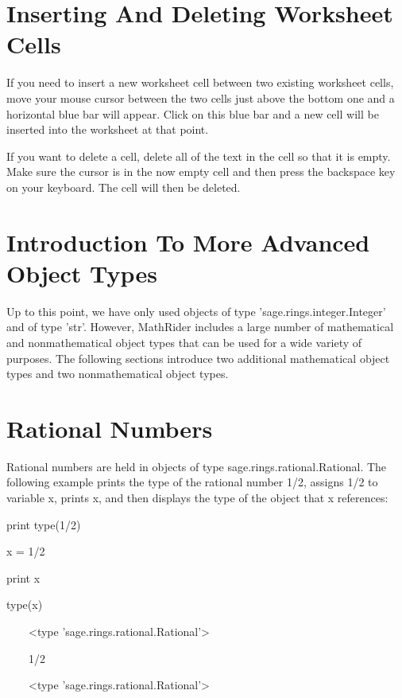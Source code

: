\documentclass[12pt,oneside]{book}
\begin{document}
\section[Inserting And Deleting Worksheet Cells]{Inserting And Deleting Worksheet Cells}

If you need to insert a new worksheet cell between two existing worksheet cells, move your mouse cursor between the two cells just above the bottom one and a horizontal blue bar will appear. Click on this blue bar and a new cell will be inserted into the worksheet at that point. 

If you want to delete a cell, delete all of the text in the cell so that it is empty. Make sure the cursor is in the now empty cell and then press the backspace key on your keyboard. The cell will then be deleted.

\section[Introduction To More Advanced Object Types]{Introduction To More Advanced Object Types}

Up to this point, we have only used objects of type 'sage.rings.integer.Integer' and of type 'str'. However, MathRider includes a large number of mathematical and nonmathematical object types that can be used for a wide variety of purposes. The following sections introduce two additional mathematical object types and two nonmathematical object types. 

\section[Rational Numbers]{Rational Numbers}

Rational numbers are held in objects of type sage.rings.rational.Rational. The following example prints the type of the rational number 1/2, assigns 1/2 to variable x, prints x, and then displays the type of the object that x references:

print type(1/2)

x = 1/2

print x

type(x)

{\textbar}

\ \ \ \ {\textless}type 'sage.rings.rational.Rational'{\textgreater}

\ \ \ \ 1/2

\ \ \ \ {\textless}type 'sage.rings.rational.Rational'{\textgreater}
\end{document}
